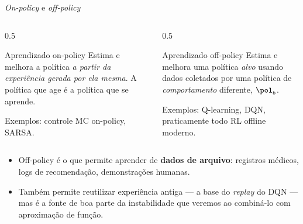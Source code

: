 \documentclass[aspectratio=169, 11pt]{beamer}
\newcommand{\polb}{\pol_b}                 %
\begin{document}
\begin{frame}{\emph{On-policy} e \emph{off-policy}}

  \begin{columns}[T]
    \begin{column}{0.5\textwidth}
      \begin{defbox}{Aprendizado on-policy}
        Estima e melhora a política \emph{a partir da experiência gerada
        por ela mesma}. A política que age é a política que se aprende.
        \smallskip

        {\footnotesize Exemplos: controle MC on-policy, SARSA.}
      \end{defbox}
    \end{column}
    \begin{column}{0.5\textwidth}
      \begin{defbox}{Aprendizado off-policy}
        Estima e melhora uma política \emph{alvo} usando dados coletados
        por uma política de \emph{comportamento} diferente, $\polb$.
        \smallskip

        {\footnotesize Exemplos: Q-learning, DQN, praticamente todo RL
        offline moderno.}
      \end{defbox}
    \end{column}
  \end{columns}

  \medskip
  \begin{itemize}\setlength{\itemsep}{0.3ex}
    \item Off-policy é o que permite aprender de \textbf{dados de arquivo}:
      registros médicos, logs de recomendação, demonstrações humanas.
    \item Também permite reutilizar experiência antiga --- a base do
      \emph{replay} do DQN --- mas é a fonte de boa parte da instabilidade
      que veremos ao combiná-lo com aproximação de função.
  \end{itemize}
\end{frame}
\end{document}
